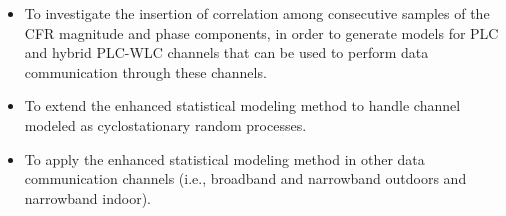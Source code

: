 \begin{itemize}
	\item To investigate the insertion of correlation among consecutive samples of the \ac{CFR} magnitude and phase components, in order to generate models for \ac{PLC} and hybrid \ac{PLC}-\ac{WLC} channels that can be used to perform data communication through these channels. 
	
	\item To extend the enhanced statistical modeling method to handle channel modeled as cyclostationary random processes.

	\item To apply the enhanced statistical modeling method in other data communication channels (i.e., broadband and narrowband outdoors and narrowband indoor).
\end{itemize}